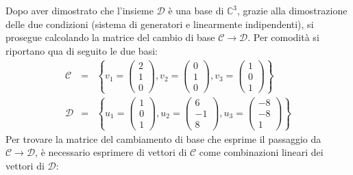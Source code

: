 \documentclass[a4paper]{article}
\begin{document}
	\noindent
	Dopo aver dimostrato che l'insieme $\mathscr{D}$ è una base di $\mathbb{C}^{3}$, grazie alla dimostrazione delle due condizioni (sistema di generatori e linearmente indipendenti), si prosegue calcolando la matrice del cambio di base $\mathscr{C} \rightarrow \mathscr{D}$. Per comodità si riportano qua di seguito le due basi:
	\begin{equation*}
		\begin{array}{lll}
			\mathscr{C} &=& \left\{v_{1} = \begin{pmatrix}
				2 \\ 1 \\ 0
			\end{pmatrix}, v_{2} = \begin{pmatrix}
				0 \\ 1 \\ 0
			\end{pmatrix}, v_{3} = \begin{pmatrix}
				1 \\ 0 \\ 1
			\end{pmatrix}\right\} \\ [1.8em]
			\mathscr{D} &=& \left\{u_{1} = \begin{pmatrix}
				1 \\ 0 \\ 1
			\end{pmatrix}, u_{2} = \begin{pmatrix}
				6 \\ -1 \\ 8
			\end{pmatrix}, u_{3} = \begin{pmatrix}
				-8 \\ -8 \\ 1
			\end{pmatrix}\right\}
		\end{array}
	\end{equation*}
	Per trovare la matrice del cambiamento di base che esprime il passaggio da $\mathscr{C} \rightarrow \mathscr{D}$, è necessario esprimere di vettori di $\mathscr{C}$ come combinazioni lineari dei vettori di $\mathscr{D}$:
\end{document}
